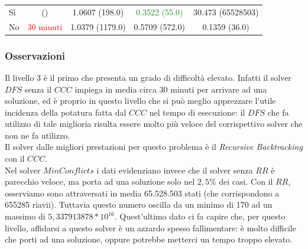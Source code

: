 \begin{table} 
	\begin{tabular}{|l||*{4}{c|}}\hline 
		\backslashbox{Miglioria}{Solver} 
		&\makebox{DFS}&\makebox{Backtracking}&\makebox{Recursive Backtracking}	&\makebox{MinConflicts}\\ \hline 
		Sì& ()&1.0607 (198.0)&\textcolor{ForestGreen}{0.3522 (55.0)}&30.473 (65528503) \\ \hline 
		No& \textcolor{red}{30 minuti}&1.0379 (1179.0)&0.5709 (572.0)&0.1359 (36.0)  \\ \hline 
	\end{tabular} 
\end{table}

\subsubsection{Osservazioni}
Il livello 3 è il primo che presenta un grado di difficoltà elevato. Infatti il solver $DFS$ senza il $CCC$ impiega in media circa 30 minuti per arrivare ad una soluzione, ed è proprio in questo livello che si può meglio apprezzare l'utile incidenza della potatura fatta dal $CCC$ nel tempo di esecuzione: il $DFS$ che fa utilizzo di tale miglioria risulta essere molto più veloce del corrispettivo solver che non ne fa utilizzo.\\
Il solver dalle migliori prestazioni per questo problema è il \textit{Recursive Backtracking} con il $CCC$.\\

Nel solver $MinConflicts$ i dati evidenziano invece che il solver senza $RR$ è parecchio veloce, ma porta ad una soluzione solo nel $2,5\%$ dei casi.
Con il $RR$, osserviamo sono attraversati in media 65.528.503 stati (che corrispondono a 655285 riavii). Tuttavia questo numero oscilla da un minimo di 170 ad un massimo di $5,337913878*10^{16}$.
Quest'ultimo dato ci fa capire che, per questo livello, affidarsi a questo solver è un azzardo spesso fallimentare: è molto difficile che porti ad una soluzione, oppure potrebbe metterci un tempo troppo elevato. 
